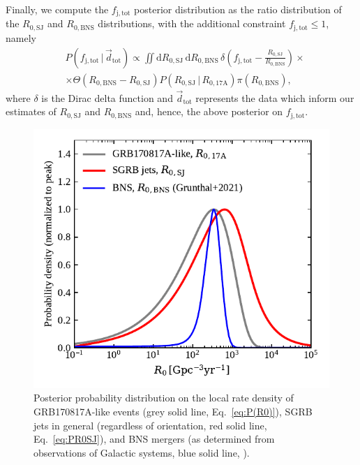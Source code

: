 \documentclass[]{aa}
\newcommand{\resp}[1]{#1}
\begin{document}
\resp{Finally, we} compute the $f_\mathrm{j,tot}$ posterior distribution as the ratio distribution of the $R_\mathrm{0,SJ}$ and $R_\mathrm{0,BNS}$ distributions, \resp{with the additional constraint $f_\mathrm{j,tot}\leq 1$, namely}
\begin{equation}\label{eq:fjtot_posterior}
\begin{split}
 & P(f_\mathrm{j,tot}\,|\,\vec d_\mathrm{tot})\propto \iint \mathrm{d}R_\mathrm{0,SJ} \, \mathrm{d}R_\mathrm{0,BNS} \,\delta\left(f_\mathrm{j,tot}-\frac{R_\mathrm{0,SJ}}{R_\mathrm{0,BNS}}\right)\times \\
 & \times\Theta(R_\mathrm{0,BNS}-R_\mathrm{0,SJ})  P(R_\mathrm{0,SJ}\,|\,R_\mathrm{0,17A})\pi(R_\mathrm{0,BNS}),
\end{split}
\end{equation}
\resp{where $\delta$ is the Dirac delta function and $\vec d_\mathrm{tot}$ represents the data which inform our estimates of $R_\mathrm{0,SJ}$ and $R_\mathrm{0,BNS}$ and, hence, the above posterior on $f_\mathrm{j,tot}$. }
%
\begin{figure}
 \centering
 \includegraphics[width=\columnwidth]{figures/R0_R0BNS_comparison.pdf}
 \caption{Posterior probability distribution on the local rate density of GRB170817A-like events (\resp{grey} solid line, Eq.~\ref{eq:P(R0)}), \resp{SGRB jets in general (regardless of orientation, red solid line, Eq.~\ref{eq:PR0SJ}), and} BNS mergers \resp{(as determined from observations of Galactic systems,} blue solid line, \citealt{Grunthal2021}).} 
 \label{fig:R0_R0BNS_comparison} 
\end{figure}
\end{document}
